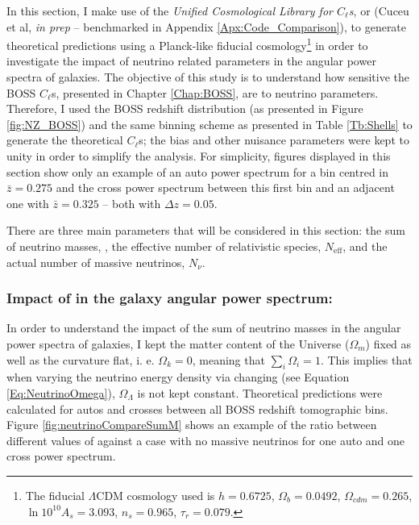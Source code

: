 \qquad In this section, I make use of the \textit{Unified Cosmological Library for $C_{\ell}$s}, or \uclcl (Cuceu et al, \textit{in prep} -- benchmarked in Appendix \ref{Apx:Code_Comparison}), to generate theoretical predictions using a Planck-like fiducial cosmology\footnote{The fiducial $\Lambda$CDM cosmology used is $h=0.6725$, $\Omega_b = 0.0492$, $\Omega_{cdm} = 0.265$, $\ln 10^{10}A_s = 3.093$, $n_s = 0.965$, $\tau_r = 0.079$.} in order to investigate the impact of neutrino related parameters in the angular power spectra of galaxies. The objective of this study is to understand how sensitive the BOSS $C_{\ell}$s, presented in Chapter \ref{Chap:BOSS}, are to neutrino parameters. Therefore, I used the BOSS redshift distribution (as presented in Figure \ref{fig:NZ_BOSS}) and the same binning scheme as presented in Table \ref{Tb:Shells} to generate the theoretical $C_{\ell}$s; the bias and other nuisance parameters were kept to unity in order to simplify the analysis. For simplicity, figures displayed in this section show only an example of an auto power spectrum for a bin centred in $\bar{z} = 0.275$ and the cross power spectrum between this first bin and an adjacent one with $\bar{z} = 0.325$ -- both with $\Delta z = 0.05$.

\qquad There are three main parameters that will be considered in this section: the sum of neutrino masses, \NM{}, the effective number of relativistic species, $N_{\text{eff}}$, and the actual number of massive neutrinos, $N_{\nu}$.

\subsubsection{Impact of \NM{} in the galaxy angular power spectrum:}
In order to understand the impact of the sum of neutrino masses in the angular power spectra of galaxies, I kept the matter content of the Universe ($\Omega_m$) fixed as well as the curvature flat, i. e. $\Omega_{k} = 0$, meaning that $\sum_i \Omega_i = 1$. This implies that when varying the neutrino energy density via changing \NM{} (see Equation \ref{Eq:NeutrinoOmega}), $\Omega_{\Lambda}$ is not kept constant. Theoretical predictions were calculated for autos and crosses between all BOSS redshift tomographic bins. Figure \ref{fig:neutrinoCompareSumM} shows an example of the ratio between different values of \NM{} against a case with no massive neutrinos for one auto and one cross power spectrum.

